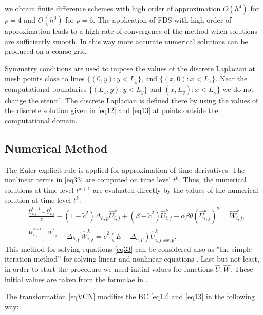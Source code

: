\documentclass[12pt]{article}
\theoremstyle{theorem}
\theoremstyle{defi}
\begin{document}
we obtain finite difference schemes with high order of approximation $O(h^4)$ for $p=4$ and  $O(h^6)$ for $p=6 $.  The application of FDS with high order of approximation leads to a high rate of convergence of the method when solutions are sufficiently smooth. In this way more accurate numerical solutions can be produced on a coarse grid.

Symmetry conditions are used to impose the values of the discrete Laplacian at mesh points close to lines $\{(0,y) : y < L_y\}$, and $\{(x,0) : x < L_x\}$. 
Near  the computational boundaries $\{(L_x,y):y<L_y\}$ and $(x,L_y):x<L_x\}$ we do not change the stencil. The discrete Laplacian
is defined  there by using the values of the discrete solution given in \eqref{eq12} and \eqref{eq13} at points outside the computational domain.

\subsection{Numerical Method}

The Euler explicit rule is applied for approximation of  time derivatives. The nonlinear terms in \eqref{eq33} are computed on time level $t^k$. Thus, the numerical solutions at time level $t^{k+1}$ are evaluated directly by the values of the numerical solution at time level $t^k$:  
 \begin{equation}\label{eq34}
 \begin{split}
   &\frac {\widehat{U}_{i,j}^{k+1}-\widehat{U}_{i,j}^{k}}{\tau}- (1-\tilde c^2 ) \Delta_{h,p} \widehat{U} _{i,j}^{k}+  (\beta-\tilde c^2 ) \widehat{U}_{i,j}^{k} - \alpha \beta \theta (\widehat{U}_{i,j}^{k})^2 = \widehat{W}_{i,j}^{k}, \\
  &\frac  {\widehat{W}_{i,j}^{k+1} -\widehat{W}_{i,j}^{k}} {\tau} - \Delta_{h,p} \widehat{W}_{i,j}^{k} =  \tilde c^2 (E- \Delta_{h,p})       
    \widehat{U}_{i,j,{\tilde x \tilde x,p}}^{k}. 
\end{split}
\end{equation}
This method for solving equations 
\eqref{eq33} can be considered also as "the simple iteration method'' for solving linear and nonlinear equations \cite{ref16}.
Last but not least, in order to start the procedure we need initial values for functions $\widehat{U},\widehat{W}$. These initial values are taken from the formulae in \cite{ref10}.

The transformation \eqref{eqVCN} modifies the BC \eqref{eq12} and \eqref{eq13} in the following way:
\end{document}
